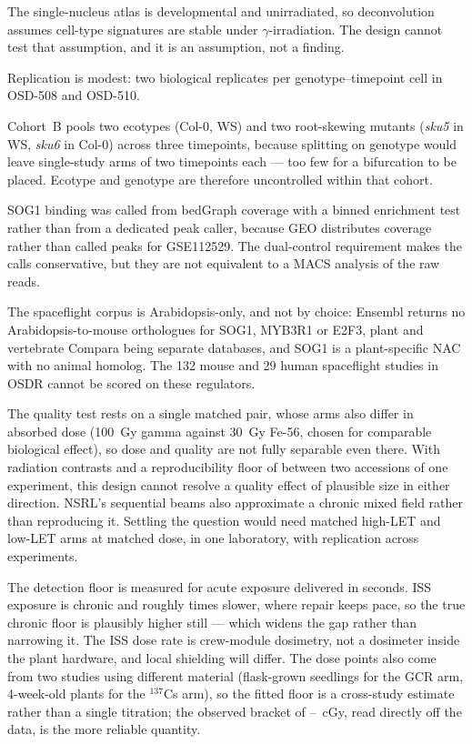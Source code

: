 The single-nucleus atlas is developmental and unirradiated, so deconvolution assumes
cell-type signatures are stable under $\gamma$-irradiation. The design cannot test that
assumption, and it is an assumption, not a finding.

Replication is modest: two biological replicates per genotype--timepoint cell in OSD-508
and OSD-510.

Cohort~B pools two ecotypes (Col-0, WS) and two root-skewing mutants (\textit{sku5} in
WS, \textit{sku6} in Col-0) across three timepoints, because splitting on genotype would
leave single-study arms of two timepoints each --- too few for a bifurcation to be placed.
Ecotype and genotype are therefore uncontrolled within that cohort.

SOG1 binding was called from bedGraph coverage with a binned enrichment test rather than
from a dedicated peak caller, because GEO distributes coverage rather than called peaks
for GSE112529. The dual-control requirement makes the calls conservative, but they are
not equivalent to a MACS analysis of the raw reads.

The spaceflight corpus is Arabidopsis-only, and not by choice: Ensembl returns no
Arabidopsis-to-mouse orthologues for SOG1, MYB3R1 or E2F3, plant and vertebrate Compara
being separate databases, and SOG1 is a plant-specific NAC with no animal homolog. The
132 mouse and 29 human spaceflight studies in OSDR cannot be scored on these regulators.

The quality test rests on a single matched pair, whose arms also differ in absorbed dose
(100~Gy gamma against 30~Gy Fe-56, chosen for comparable biological effect), so dose and
quality are not fully separable even there. With \NumRadContrasts{} radiation contrasts
and a reproducibility floor of \SameExperimentRho{} between two accessions of one
experiment, this design cannot resolve a quality effect of plausible size in either
direction. NSRL's sequential beams also approximate a chronic mixed field rather than
reproducing it. Settling the question would need matched high-LET and low-LET arms at
matched dose, in one laboratory, with replication across experiments.

The detection floor is measured for acute exposure delivered in seconds. ISS exposure is
chronic and roughly \DoseRateRatio{} times slower, where repair keeps pace, so the true
chronic floor is plausibly higher still --- which widens the gap rather than narrowing it.
The ISS dose rate is crew-module dosimetry, not a dosimeter inside the plant hardware, and
local shielding will differ. The dose points also come from two studies using different
material (flask-grown seedlings for the GCR arm, 4-week-old plants for the $^{137}$Cs
arm), so the
fitted floor is a cross-study estimate rather than a single titration; the observed
bracket of \DoseNotDetected{}--\DoseDetected{}~cGy, read directly off the data, is the more
reliable quantity.

